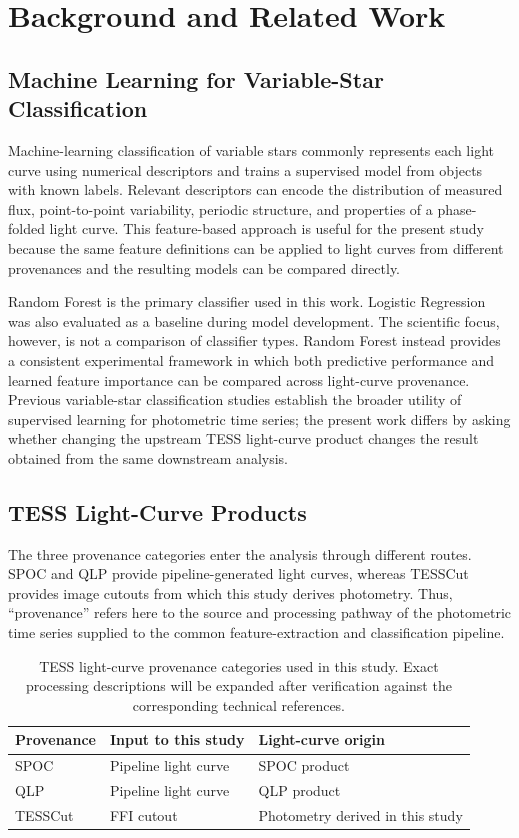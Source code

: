 \documentclass[linenumbers]{aastex701}
\begin{document}
\section{Background and Related Work}
\label{sec:background}

\subsection{Machine Learning for Variable-Star Classification}
Machine-learning classification of variable stars commonly represents each light curve using numerical descriptors and trains a supervised model from objects with known labels. Relevant descriptors can encode the distribution of measured flux, point-to-point variability, periodic structure, and properties of a phase-folded light curve. This feature-based approach is useful for the present study because the same feature definitions can be applied to light curves from different provenances and the resulting models can be compared directly.

Random Forest is the primary classifier used in this work. Logistic Regression was also evaluated as a baseline during model development. The scientific focus, however, is not a comparison of classifier types. Random Forest instead provides a consistent experimental framework in which both predictive performance and learned feature importance can be compared across light-curve provenance. Previous variable-star classification studies establish the broader utility of supervised learning for photometric time series; the present work differs by asking whether changing the upstream TESS light-curve product changes the result obtained from the same downstream analysis.


\subsection{TESS Light-Curve Products}
The three provenance categories enter the analysis through different routes. SPOC and QLP provide pipeline-generated light curves, whereas TESSCut provides image cutouts from which this study derives photometry. Thus, ``provenance'' refers here to the source and processing pathway of the photometric time series supplied to the common feature-extraction and classification pipeline.

\begin{table}[ht]
\centering
\caption{TESS light-curve provenance categories used in this study. Exact processing descriptions will be expanded after verification against the corresponding technical references.}
\label{tab:provenance_overview}
\begin{tabular}{lll}
\hline\hline
Provenance & Input to this study & Light-curve origin \\
\hline
SPOC & Pipeline light curve & SPOC product \\
QLP & Pipeline light curve & QLP product \\
TESSCut & FFI cutout & Photometry derived in this study \\
\hline
\end{tabular}
\end{table}
\end{document}
